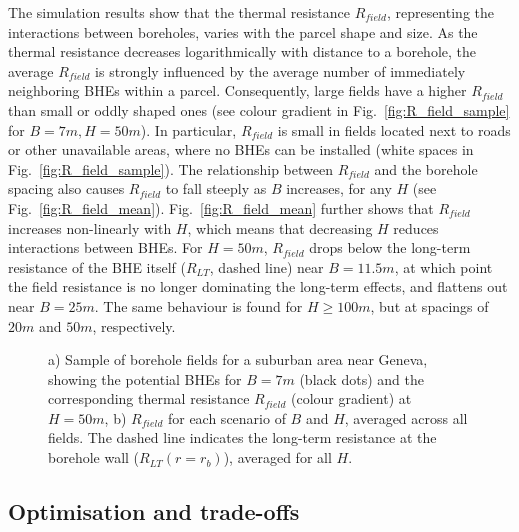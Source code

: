 The simulation results show that the thermal resistance $R_{field}$, representing the interactions between boreholes, 
varies with the parcel shape and size. 
As the thermal resistance decreases logarithmically with distance to a borehole, the average $R_{field}$ is strongly influenced by the average number of immediately neighboring BHEs within a parcel.
Consequently, large fields have a higher $R_{field}$ than small or oddly shaped ones (see colour gradient in Fig.~\ref{fig:R_field_sample} for $B=7m,H=50m$).
In particular, $R_{field}$ is small in fields located next to roads or other unavailable areas, where no BHEs can be installed (white spaces in Fig.~\ref{fig:R_field_sample}). 
%
The relationship between $R_{field}$ and the borehole spacing also causes $R_{field}$ to fall steeply as $B$ increases, for any $H$ (see Fig.~\ref{fig:R_field_mean}).
Fig.~\ref{fig:R_field_mean} further shows that $R_{field}$ increases non-linearly with $H$, which means that decreasing $H$ reduces interactions between BHEs.
%
For $H = 50m$, $R_{field}$ drops below the long-term resistance of the BHE itself ($R_{LT}$, dashed line) near $B = 11.5m$, at which point the field resistance is no longer dominating the long-term effects, and flattens out near $B = 25m$. 
The same behaviour is found for $H \geq 100m$, but at spacings of $20m$ and $50m$, respectively.

\begin{figure}[tb]
\centering
{}
\caption{a) Sample of borehole fields for a suburban area near Geneva, showing the potential BHEs for $B = 7m$ (black dots) and the corresponding thermal resistance $R_{field}$ (colour gradient) at $H = 50m$, b) $R_{field}$ for each scenario of $B$ and $H$, averaged across all fields. The dashed line indicates the long-term resistance at the borehole wall ($R_{LT}(r=r_b)$), averaged for all $H$.}
\label{fig:R_field}
\end{figure}

\subsection{Optimisation and trade-offs}

